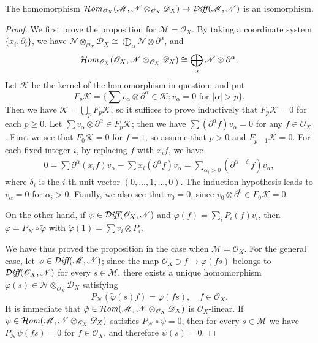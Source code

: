 \begin{proposition}\label{D-module differential module char}
The homomorphism $\operatorname{\mathcal{H}\hspace*{-0.4pt}\textit{om}\hspace{0.5pt}}_{\mathscr{O}_X}(\mathscr{M},\mathscr{N}\otimes_{\mathscr{O}_X}\mathscr{D}_X)\to\operatorname{\mathcal{D}\hspace*{-0.2pt}\textit{iff}\hspace{0.5pt}}(\mathscr{M},\mathscr{N})$ is an isomorphism.
\end{proposition}
\begin{proof}
We first prove the proposition for $\mathscr{M}=\mathscr{O}_X$. By taking a coordinate system $\{x_i,\partial_i\}$, we have $\mathscr{N}\otimes_{\mathscr{O}_X}\mathscr{D}_X\cong\bigoplus_\alpha\mathscr{N}\otimes\partial^\alpha$, and
\[\operatorname{\mathcal{H}\hspace*{-0.4pt}\textit{om}\hspace{0.5pt}}_{\mathscr{O}_X}(\mathscr{O}_X,\mathscr{N}\otimes_{\mathscr{O}_X}\mathscr{D}_X)\cong \bigoplus_\alpha\mathscr{N}\otimes\partial^\alpha.\]
Let $\mathscr{K}$ be the kernel of the homomorphism in question, and put
\[F_p\mathscr{K}=\{\sum v_\alpha\otimes\partial^\alpha\in\mathscr{K}:\text{$v_\alpha=0$ for $|\alpha|>p$}\}.\]
Then we have $\mathscr{K}=\bigcup_pF_p\mathscr{K}$, so it suffices to prove inductively that $F_p\mathscr{K}=0$ for each $p\geq 0$. Let $\sum v_\alpha\otimes\partial^\alpha\in F_p\mathscr{K}$; then we have $\sum(\partial^\alpha f)v_\alpha=0$ for any $f\in\mathscr{O}_X$. First we see that $F_0\mathscr{K}=0$ for $f=1$, so assume that $p>0$ and $F_{p-1}\mathscr{K}=0$. For each fixed integer $i$, by replacing $f$ with $x_if$, we have
\begin{align*}
0=\sum \partial^\alpha(x_if)v_\alpha-\sum x_i(\partial^\alpha f)v_\alpha=\sum_{\alpha_i>0}(\partial^{\alpha-\delta_i}f)v_\alpha,
\end{align*}
where $\delta_i$ is the $i$-th unit vector $(0,\dots,1,\dots,0)$. The induction hypothesis leads to $v_\alpha=0$ for $\alpha_i>0$. Fianlly, we also see that $v_0=0$, since $v_0\otimes\partial^0\in F_0\mathscr{K}=0$.\par
On the other hand, if $\varphi\in\operatorname{\mathcal{D}\hspace*{-0.2pt}\textit{iff}\hspace{0.5pt}}(\mathscr{O}_X,\mathscr{N})$ and $\varphi(f)=\sum_iP_i(f)v_i$, then $\varphi=P_\mathscr{N}\circ\tilde{\varphi}$ with $\tilde{\varphi}(1)=\sum v_i\otimes P_i$.\par
We have thus proved the proposition in the case when $\mathscr{M}=\mathscr{O}_X$. For the general case, let $\varphi\in\operatorname{\mathcal{D}\hspace*{-0.2pt}\textit{iff}\hspace{0.5pt}}(\mathscr{M},\mathscr{N})$; since the map $\mathscr{O}_X\ni f\mapsto\varphi(fs)$ belongs to $\operatorname{\mathcal{D}\hspace*{-0.2pt}\textit{iff}\hspace{0.5pt}}(\mathscr{O}_X,\mathscr{N})$ for every $s\in\mathscr{M}$, there exists a unique homomorphism $\tilde{\varphi}(s)\in\mathscr{N}\otimes_{\mathscr{O}_X}\mathscr{D}_X$ satisfying
\[P_\mathscr{N}(\tilde{\varphi}(s)f)=\varphi(fs),\quad f\in\mathscr{O}_X.\]
It is immediate that $\tilde{\varphi}\in\operatorname{\mathcal{H}\hspace*{-0.4pt}\textit{om}\hspace{0.5pt}}(\mathscr{M},\mathscr{N}\otimes_{\mathscr{O}_X}\mathscr{D}_X)$ is $\mathscr{O}_X$-linear. If $\psi\in\operatorname{\mathcal{H}\hspace*{-0.4pt}\textit{om}\hspace{0.5pt}}(\mathscr{M},\mathscr{N}\otimes_{\mathscr{O}_X}\mathscr{D}_X)$ satisfies $P_\mathscr{N}\circ\psi=0$, then for every $s\in\mathscr{M}$ we have $P_\mathscr{N}\psi(fs)=0$ for $f\in\mathscr{O}_X$, and therefore $\psi(s)=0$.
\end{proof}

